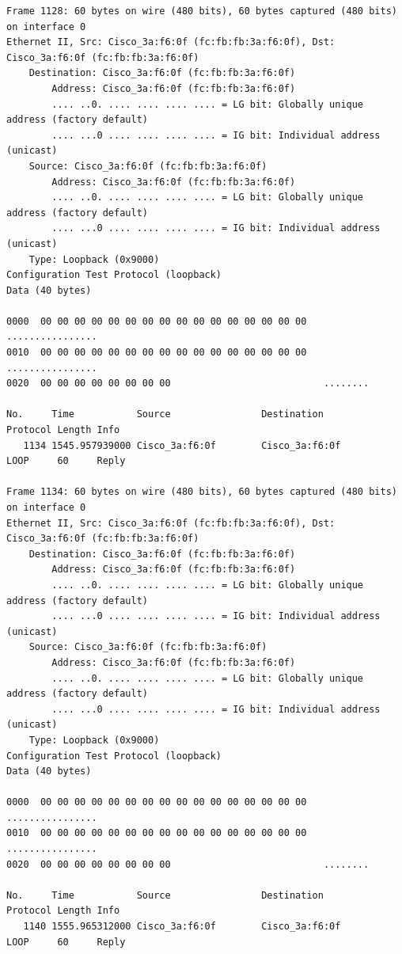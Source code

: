 \documentclass[a4paper,11pt]{article}
\begin{document}
\begin{lstlisting}
Frame 1128: 60 bytes on wire (480 bits), 60 bytes captured (480 bits) on interface 0
Ethernet II, Src: Cisco_3a:f6:0f (fc:fb:fb:3a:f6:0f), Dst: Cisco_3a:f6:0f (fc:fb:fb:3a:f6:0f)
    Destination: Cisco_3a:f6:0f (fc:fb:fb:3a:f6:0f)
        Address: Cisco_3a:f6:0f (fc:fb:fb:3a:f6:0f)
        .... ..0. .... .... .... .... = LG bit: Globally unique address (factory default)
        .... ...0 .... .... .... .... = IG bit: Individual address (unicast)
    Source: Cisco_3a:f6:0f (fc:fb:fb:3a:f6:0f)
        Address: Cisco_3a:f6:0f (fc:fb:fb:3a:f6:0f)
        .... ..0. .... .... .... .... = LG bit: Globally unique address (factory default)
        .... ...0 .... .... .... .... = IG bit: Individual address (unicast)
    Type: Loopback (0x9000)
Configuration Test Protocol (loopback)
Data (40 bytes)

0000  00 00 00 00 00 00 00 00 00 00 00 00 00 00 00 00   ................
0010  00 00 00 00 00 00 00 00 00 00 00 00 00 00 00 00   ................
0020  00 00 00 00 00 00 00 00                           ........

No.     Time           Source                Destination           Protocol Length Info
   1134 1545.957939000 Cisco_3a:f6:0f        Cisco_3a:f6:0f        LOOP     60     Reply

Frame 1134: 60 bytes on wire (480 bits), 60 bytes captured (480 bits) on interface 0
Ethernet II, Src: Cisco_3a:f6:0f (fc:fb:fb:3a:f6:0f), Dst: Cisco_3a:f6:0f (fc:fb:fb:3a:f6:0f)
    Destination: Cisco_3a:f6:0f (fc:fb:fb:3a:f6:0f)
        Address: Cisco_3a:f6:0f (fc:fb:fb:3a:f6:0f)
        .... ..0. .... .... .... .... = LG bit: Globally unique address (factory default)
        .... ...0 .... .... .... .... = IG bit: Individual address (unicast)
    Source: Cisco_3a:f6:0f (fc:fb:fb:3a:f6:0f)
        Address: Cisco_3a:f6:0f (fc:fb:fb:3a:f6:0f)
        .... ..0. .... .... .... .... = LG bit: Globally unique address (factory default)
        .... ...0 .... .... .... .... = IG bit: Individual address (unicast)
    Type: Loopback (0x9000)
Configuration Test Protocol (loopback)
Data (40 bytes)

0000  00 00 00 00 00 00 00 00 00 00 00 00 00 00 00 00   ................
0010  00 00 00 00 00 00 00 00 00 00 00 00 00 00 00 00   ................
0020  00 00 00 00 00 00 00 00                           ........

No.     Time           Source                Destination           Protocol Length Info
   1140 1555.965312000 Cisco_3a:f6:0f        Cisco_3a:f6:0f        LOOP     60     Reply


\end{lstlisting}
\end{document}
